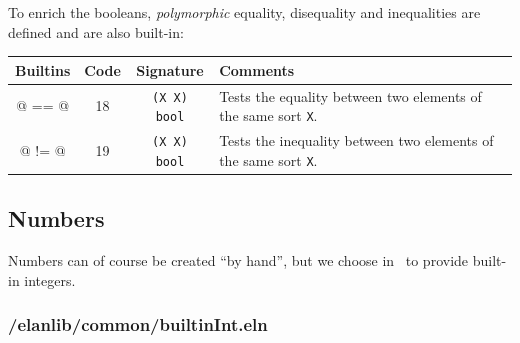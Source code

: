 
To enrich the booleans, {\it polymorphic\/} equality, disequality and
inequalities are defined and are also built-in:\\

\noindent \begin{tabular}{|c|c|c|p{9cm}|}
\hline
{\bf Builtins} & {\bf Code} & {\bf Signature} & {\bf Comments} \\
\hline
\hline
@ == @          & 18 & {\tt (X X) bool} & Tests the equality between two elements of the same sort {\tt X}.\\
@ != @          & 19 & {\tt (X X) bool} & Tests the inequality between two elements of the same sort {\tt X}.\\
\hline
\end{tabular}



\subsection{Numbers}

Numbers can of course be created ``by hand'', but we choose in \elan\
to provide built-in integers.\\

\subsubsection{/elanlib/common/builtinInt.eln}


